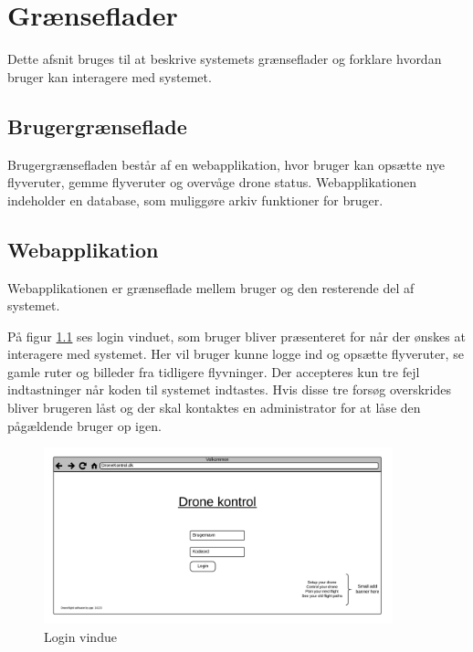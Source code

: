 \chapter{Grænseflader}
Dette afsnit bruges til at beskrive systemets grænseflader og forklare hvordan bruger kan interagere med systemet.

\section{Brugergrænseflade}
Brugergrænsefladen består af en webapplikation, hvor bruger kan opsætte nye flyveruter, gemme flyveruter og overvåge drone status. Webapplikationen indeholder en database, som muliggøre arkiv funktioner for bruger. 

\section{Webapplikation}
Webapplikationen er grænseflade mellem bruger og den resterende del af systemet. 

På figur \ref{fig:mockup_login} ses login vinduet, som bruger bliver præsenteret for når der ønskes at interagere med systemet. Her vil bruger kunne logge ind og opsætte flyveruter, se gamle ruter og billeder fra tidligere flyvninger. Der accepteres kun tre fejl indtastninger når koden til systemet indtastes. Hvis disse tre forsøg overskrides bliver brugeren låst og der skal kontaktes en administrator for at låse den pågældende bruger op igen.

\vspace{-5pt}
\begin{figure}[H]
	\centering
	\includegraphics[width=0.9\textwidth]{Billeder/UI_mockups/login.png}
	\vspace{-.5cm}
	\caption{Login vindue}
	\label{fig:mockup_login}
\end{figure}

 \newpage

